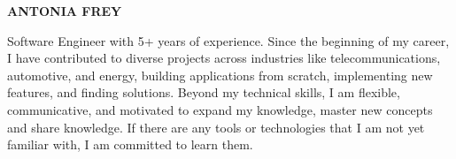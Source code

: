 \documentclass[10pt, a4paper]{article}
\begin{document}
\setlength{\topskip}{0pt}
\setlength{\parindent}{0pt}
\setlength{\parskip}{0pt}
\setlength{\fboxsep}{0pt}
\pagestyle{empty}
\raggedbottom
{}

\begin{minipage}[t]{0.33\textwidth} 
\colorbox{cvblue}{\begin{minipage}[t][5mm][t]{\textwidth}\null\hfill\null\end{minipage}}

\vspace{-.2ex} 
\colorbox{cvblue!90}{\color{white}  
\textwidth\relax
\begin{minipage}[t][293mm][t]{0.82\textwidth}
\raggedright
\vspace*{2.5ex}


\noindent
\null\hfill%
%
\hfill\null

\vspace*{1ex}
{\centering 
\LARGE \textbf{\MakeUppercase{Antonia Frey}}\\
}


\parbox{1\textwidth}{
{\small
\justifying
\noindent Software Engineer with 5+ years of experience. Since the beginning of my career, I have contributed to diverse projects across industries like telecommunications, automotive, and energy, building applications from scratch, implementing new features, and finding solutions. Beyond my technical skills, I am flexible, communicative, and motivated to expand my knowledge, master new concepts and share knowledge. If there are any tools or technologies that I am not yet familiar with, I am committed to learn them.
}}



\end{minipage}}
\end{minipage}
\end{document}
